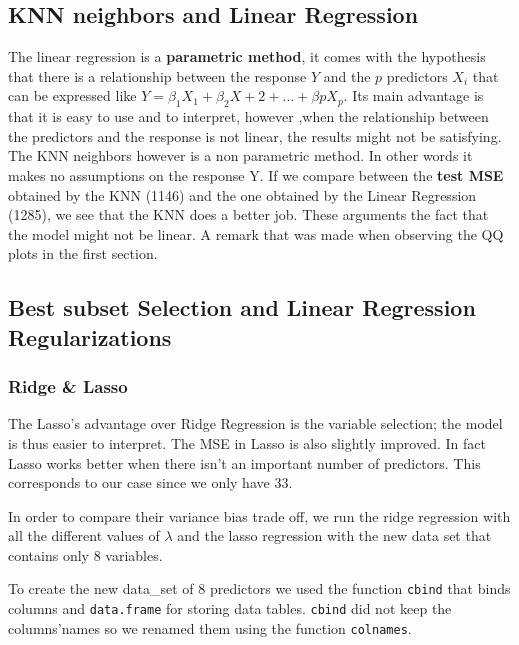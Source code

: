 \documentclass[]{report}
\begin{document}
\subsection{KNN neighbors and Linear Regression}
 The linear regression is a \textbf{parametric method}, it comes with the hypothesis that there is a relationship between the response $Y$ and the $p$ predictors $X_{i}$ that can be expressed like $Y =\beta_{1}X_{1}+\beta_{2}X+{2}+...+\beta{p}X_{p}$. Its main advantage is that it is easy to use and to interpret, however ,when the relationship between the predictors and the response is not linear, the results might not be satisfying. The KNN neighbors however is a non parametric method. In other words it makes no assumptions on the response Y. If we compare between the \textbf{test MSE} obtained by the KNN (1146) and the one obtained by the Linear Regression (1285), we see that the KNN does a better job. These arguments the fact that the model might not be linear. A remark that was made when observing the QQ plots in the first section. 
\subsection{Best subset Selection and Linear Regression Regularizations}
\subsubsection{Ridge \& Lasso }
The Lasso's advantage over Ridge Regression is the variable selection; the model is thus easier to interpret. The MSE in Lasso is also slightly improved. In fact Lasso works better when there isn't an important number of predictors. This corresponds to our case since we only have 33. 

In order to compare their variance bias trade off, we run the ridge regression with all the different values of $\lambda$ and the lasso regression with the new data set that contains only 8 variables.

To create the new data\_set of 8 predictors we used the function \texttt{cbind} that binds columns and \texttt{data.frame} for storing data tables. \texttt{cbind} did not keep the columns'names so we renamed them using the function \texttt{colnames}.
\end{document}

